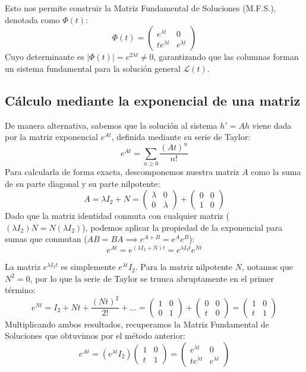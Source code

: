 Esto nos permite construir la Matriz Fundamental de Soluciones (M.F.S.), denotada como $\Phi(t)$:
\[
    \Phi(t) = \begin{pmatrix} e^{\lambda t} & 0 \\ t e^{\lambda t} & e^{\lambda t} \end{pmatrix}
\]
Cuyo determinante es $|\Phi(t)| = e^{2\lambda t} \neq 0$, garantizando que las columnas forman un sistema fundamental para la solución general $\mathcal{L}(t)$.

\subsection{Cálculo mediante la exponencial de una matriz}

De manera alternativa, sabemos que la solución al sistema $h' = Ah$ viene dada por la matriz exponencial $e^{At}$, definida mediante su serie de Taylor:
\[
    e^{At} = \sum_{n \ge 0} \frac{(At)^n}{n!}
\]
Para calcularla de forma exacta, descomponemos nuestra matriz $A$ como la suma de su parte diagonal y su parte nilpotente:
\[
    A = \lambda I_2 + N = \begin{pmatrix} \lambda & 0 \\ 0 & \lambda \end{pmatrix} + \begin{pmatrix} 0 & 0 \\ 1 & 0 \end{pmatrix}
\]
Dado que la matriz identidad conmuta con cualquier matriz ($(\lambda I_2)N = N(\lambda I_2)$), podemos aplicar la propiedad de la exponencial para sumas que conmutan ($AB=BA \implies e^{A+B} = e^A e^B$):
\[
    e^{At} = e^{(\lambda I_2 + N)t} = e^{\lambda I_2 t} e^{Nt}
\]

La matriz $e^{\lambda I_2 t}$ es simplemente $e^{\lambda t} I_2$. Para la matriz nilpotente $N$, notamos que $N^2 = 0$, por lo que la serie de Taylor se trunca abruptamente en el primer término:
\[
    e^{Nt} = I_2 + Nt + \frac{(Nt)^2}{2!} + \dots = \begin{pmatrix} 1 & 0 \\ 0 & 1 \end{pmatrix} + \begin{pmatrix} 0 & 0 \\ t & 0 \end{pmatrix} = \begin{pmatrix} 1 & 0 \\ t & 1 \end{pmatrix}
\]
Multiplicando ambos resultados, recuperamos la Matriz Fundamental de Soluciones que obtuvimos por el método anterior:
\[
    e^{At} = \left( e^{\lambda t} I_2 \right) \begin{pmatrix} 1 & 0 \\ t & 1 \end{pmatrix} = \begin{pmatrix} e^{\lambda t} & 0 \\ t e^{\lambda t} & e^{\lambda t} \end{pmatrix}
\]

